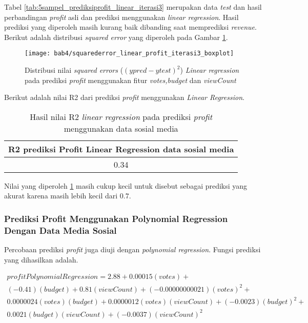 Tabel \ref{tab:5sampel_prediksiprofit_linear_iterasi3} merupakan data \textit{test} dan hasil perbandingan \textit{profit} asli dan prediksi menggunakan \textit{linear regression}. Hasil prediksi yang diperoleh masih kurang baik dibanding saat memprediksi \textit{revenue}. Berikut adalah distribusi \textit{squared error} yang diperoleh pada Gambar \ref{fig:squarederror_linear_profit_iterasi3_boxplot}.

 
\begin{figure}[H]
	\centering  
	\texttt{[image: bab4/squarederror\_linear\_profit\_iterasi3\_boxplot]}   
	\caption{Distribusi nilai \textit{squared errors} ($(ypred-ytest)^2$) \textit{Linear regression} pada prediksi \textit{profit} menggunakan fitur \textit{votes,budget} dan \textit{viewCount}}	\label{fig:squarederror_linear_profit_iterasi3_boxplot} 
\end{figure}

Berikut adalah nilai R2 dari prediksi \textit{profit} menggunakan \textit{Linear Regression}. 

\begin{table}[H]
\centering
\caption{Hasil nilai R2 \textit{linear regression} pada prediksi \textit{profit} menggunakan data sosial media }
\begin{tabular}{|c|}
\hline 
R2 prediksi Profit Linear Regression data sosial media \\ 
\hline 
0.34 \\ 
\hline 
\end{tabular} 
\label{tab:r2_linear_profit_iterasi3}
\end{table}

Nilai yang diperoleh \ref{tab:r2_linear_profit_iterasi3} masih cukup kecil untuk disebut sebagai prediksi yang akurat karena masih lebih kecil dari $0.7$. 


\subsubsection{Prediksi Profit Menggunakan Polynomial Regression Dengan Data Media Sosial}

Percobaan prediksi \textit{profit} juga diuji dengan \textit{polynomial regression}. Fungsi prediksi yang dihasilkan adalah. 

\begin{equation}
\begin{split}
profitPolynomialRegression = 2.88  + 0.00015 (votes) + \\ (-0.41) (budget) + 0.81 (viewCount) + (-0.00000000021) (votes)^2  +\\ 0.0000024 (votes)(budget) + 0.0000012 (votes)(viewCount) + (-0.0023) (budget) ^ 2 + \\ 0.0021 (budget)(viewCount) + (-0.0037) (viewCount) ^2
\end{split}
\label{eqref:fungsipolinom_profit_iterasi3}
\end{equation}

